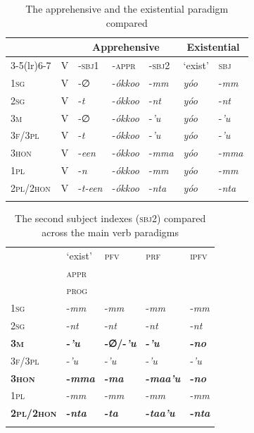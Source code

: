 \documentclass[output=paper,colorlinks,citecolor=brown,]{langscibook}
\begin{document}
\begin{table}
    \begin{tabular}{lllll ll}
\lsptoprule
&    &  \multicolumn{3}{c}{Apprehensive}                  & \multicolumn{2}{c}{Existential}\\\cmidrule(lr){3-5}\cmidrule(lr){6-7}
&  V & -\textsc{sbj1} & -\textsc{appr} & -\textsc{sbj2} & `exist' & \textsc{sbj}\\
\midrule
\textsc{1sg} & V & -∅ & -\textit{ókkoo}	& -\textit{mm} & \textit{yóo} & -\textit{mm}\\
\textsc{2sg} & V &	-\textit{t}	& -\textit{ókkoo} & -\textit{nt} & \textit{yóo} & -\textit{nt}\\
\textsc{3m}	& V & -∅ & -\textit{ókkoo}	& -\textit{'u}	& \textit{yóo} & -\textit{'u}\\
\textsc{3f/3pl} & V & -\textit{t} & -\textit{ókkoo} & -\textit{'u} & \textit{yóo} & -\textit{'u}\\
\textsc{3hon} & V & -\textit{een} &	-\textit{ókkoo} & -\textit{mma} & \textit{yóo} & 	-\textit{mma}\\
\textsc{1pl} & V & 	-\textit{n} & -\textit{ókkoo} & -\textit{mm} & \textit{yóo} & -\textit{mm}\\
\textsc{2pl/2hon} & V &	-\textit{t-een} & -\textit{ókkoo} & -\textit{nta} & \textit{yóo} & -\textit{nta}\\
\lspbottomrule
\end{tabular}
    \caption{The apprehensive and the existential paradigm compared}
    \label{tab:treis:4}
\end{table}

\begin{table}
    \begin{tabular}{lllll}
\lsptoprule
&  `exist' & \textsc{pfv} & \textsc{prf} & \textsc{ipfv}\\
&  \textsc{appr} & & & \\
&  \textsc{prog} & & & \\
\midrule
\textsc{1sg} & -\textit{mm} & -\textit{mm} & -\textit{mm} & -\textit{mm} \\
\textsc{2sg} & -\textit{nt} & -\textit{nt} & -\textit{nt} & -\textit{nt} \\
\textbf{\textsc{3m}} & \textbf{-\textit{'u}} & \textbf{-∅\slash -\textit{'u}} & \textbf{-\textit{'u}}	& \textbf{-\textit{no}}\\
\textsc{3f/3pl} & -\textit{'u} & -\textit{'u} & -\textit{'u} & -\textit{'u}\\
\textbf{\textsc{3hon}} & \textbf{-\textit{mma}} & \textbf{-\textit{ma}} & \textbf{-\textit{maa'u}} & \textbf{-\textit{no}}\\
\textsc{1pl} & -\textit{mm} & -\textit{mm} & -\textit{mm} & -\textit{mm}\\
\textbf{\textsc{2pl/2hon}} & \textbf{-\textit{nta}} & \textbf{-\textit{ta}} & \textbf{-\textit{taa'u}} & \textbf{-\textit{nta}}\\
\lspbottomrule
\end{tabular}
    \caption{The second subject indexes (\textsc{sbj2}) compared across the main verb paradigms}
    \label{tab:treis:5}
\end{table}
\end{document}
